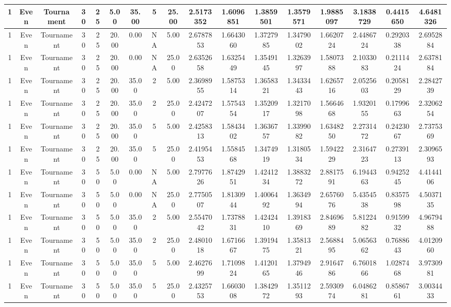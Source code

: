 \begin{longtable}{ | c | c | c | c | c | c | c | c | c | c | c | c | c | c | c | c | c | }
	\hline
	1	&	Even	&	Tournament	&	30	&	25	&	5.00	&	35.00	&	5	&	25.00	&	2.5173352	&	1.6096851	&	1.3859501	&	1.3579571	&	1.9885097	&	3.1838729	&	0.4415650	&	4.6481326 \\
	\hline
	1	&	Even	&	Tournament	&	30	&	25	&	20.00	&	0.00	&	NA	&	5.00	&	2.6787853	&	1.6643060	&	1.3727985	&	1.3479002	&	1.6620724	&	2.4486724	&	0.2920338	&	2.6952884 \\
	\hline
	1	&	Even	&	Tournament	&	30	&	25	&	20.00	&	0.00	&	NA	&	25.00	&	2.6352658	&	1.6325449	&	1.3549145	&	1.3263997	&	1.5807388	&	2.1033083	&	0.2111424	&	2.6378184 \\
	\hline
	1	&	Even	&	Tournament	&	30	&	25	&	20.00	&	35.00	&	2	&	5.00	&	2.3698955	&	1.5875314	&	1.3658321	&	1.3433443	&	1.6265716	&	2.0525603	&	0.2058129	&	2.2842739 \\
	\hline
	1	&	Even	&	Tournament	&	30	&	25	&	20.00	&	35.00	&	2	&	25.00	&	2.4247207	&	1.5754354	&	1.3520917	&	1.3217098	&	1.5664668	&	1.9320155	&	0.1799663	&	2.3206254 \\
	\hline
	1	&	Even	&	Tournament	&	30	&	25	&	20.00	&	35.00	&	5	&	5.00	&	2.4258313	&	1.5843402	&	1.3636757	&	1.3399082	&	1.6348250	&	2.2731472	&	0.2423067	&	2.7375369 \\
	\hline
	1	&	Even	&	Tournament	&	30	&	25	&	20.00	&	35.00	&	5	&	25.00	&	2.4195453	&	1.5584568	&	1.3474919	&	1.3180534	&	1.5942229	&	2.3164723	&	0.2739113	&	2.3096593 \\
	\hline
	1	&	Even	&	Tournament	&	30	&	50	&	5.00	&	0.00	&	NA	&	5.00	&	2.7977626	&	1.8742951	&	1.4241234	&	1.3883272	&	2.8817591	&	6.1944363	&	0.9425245	&	4.4144106 \\
	\hline
	1	&	Even	&	Tournament	&	30	&	50	&	5.00	&	0.00	&	NA	&	25.00	&	2.7750507	&	1.8130944	&	1.4006492	&	1.3634994	&	2.6576076	&	5.4354538	&	0.8357598	&	4.5037135 \\
	\hline
	1	&	Even	&	Tournament	&	30	&	50	&	5.00	&	35.00	&	2	&	5.00	&	2.5547042	&	1.7378831	&	1.4242410	&	1.3918369	&	2.8469689	&	5.8122482	&	0.9159932	&	4.9679488 \\
	\hline
	1	&	Even	&	Tournament	&	30	&	50	&	5.00	&	35.00	&	2	&	25.00	&	2.4801018	&	1.6716667	&	1.3919475	&	1.3581321	&	2.5688495	&	5.0656362	&	0.7688643	&	4.0120960 \\
	\hline
	1	&	Even	&	Tournament	&	30	&	50	&	5.00	&	35.00	&	5	&	5.00	&	2.4627699	&	1.7109824	&	1.4120165	&	1.3794946	&	2.9164786	&	6.7601866	&	1.0287468	&	3.9730981 \\
	\hline
	1	&	Even	&	Tournament	&	30	&	50	&	5.00	&	35.00	&	5	&	25.00	&	2.4325753	&	1.6603008	&	1.3842972	&	1.3511293	&	2.5930974	&	6.0486281	&	0.8586761	&	3.0034433 \\

\end{longtable}
